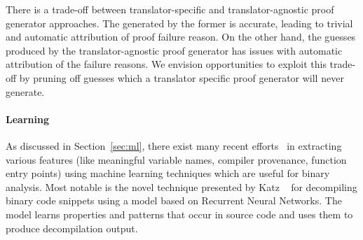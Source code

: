 There is a trade-off between translator-specific and translator-agnostic proof
generator approaches. The \syncps generated by the former is accurate, leading
to trivial and automatic attribution of proof failure reason. On the other
hand, the \syncp guesses produced by the  translator-agnostic proof generator
has issues with automatic attribution  of the failure reasons. We envision
opportunities to exploit this trade-off by pruning off \syncp  guesses which a
translator specific proof generator will never generate. 

\paragraph{\textbf{Learning \syncps}}

As discussed in Section~\ref{sec:ml}, there exist many recent
efforts~\cite{Jaffe:2018ICPC,Rosenblum2007,Rosenblum:2008,Rosenblum:2010,Rosenblum:2011,Bao:2014,Shin:2015}
in extracting various features (like meaningful variable names, compiler
    provenance, function entry points) using machine learning techniques which
are useful for binary analysis. Most notable is the novel technique presented
by Katz \etal~\cite{katz2018rnn}  for decompiling binary code snippets using a
model based on Recurrent Neural Networks. The model learns properties and
patterns that occur in source code and uses them to produce decompilation
output. 
%

